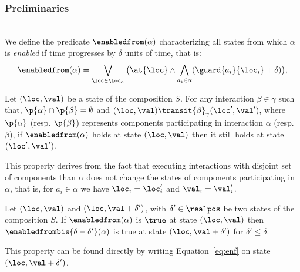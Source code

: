 \subsubsection*{Preliminaries}\label{subsec:wp}\mbox{}\\ 
  We define the predicate $\enabledfrom(\alpha)$ characterizing all states
  from which $\alpha$ is \emph{enabled} if time progresses by $\delta$ units of time, that is:
  \begin{equation}\label{eq:enf}
    \enabledfrom(\alpha)=\bigvee_{\loc\in\Loc_{\alpha}} \big(\at{\loc}\wedge\bigwedge_{a_i\in\alpha}
    (\guard{a_i}{\loc_i}+\delta)\big), 
\end{equation}

\begin{property}\label{pt:enf1}
  Let $(\loc,\val)$ be a state of the composition $S$. For any interaction $\beta\in\gamma$ such that, $\p{\alpha}\cap\p{\beta}=\emptyset$
  and $(\loc,\val)\transit{\beta}_{\gamma}(\loc',\val')$, where $\p{\alpha}$ (resp. $\p{\beta}$) represents components participating in 
  interaction $\alpha$ (resp. $\beta$), if $\enabledfrom(\alpha)$ holds at state $(\loc,\val)$ then it still holds at state $(\loc',\val')$.
\end{property}
This property derives from the fact that executing interactions with disjoint set of components than $\alpha$ does not change the states
of components participating in $\alpha$, that is, for $a_i\in\alpha$ we have $\loc_i=\loc'_i$ and $\val_i=\val'_i$.
\begin{property}\label{pt:enf2}
  Let $(\loc,\val)$ and $(\loc,\val+\delta')$, with $\delta'\in\realpos$ be two states of the composition $S$. 
  If $\enabledfrom(\alpha)$ is $\true$ at state $(\loc,\val)$ then $\enabledfrombis{\delta-\delta'}(\alpha)$ is true at state
  $(\loc,\val+\delta')$ for $\delta'\le\delta$.
\end{property}
This property can be found directly by writing Equation~\ref{eq:enf} on state $(\loc,\val+\delta')$.

